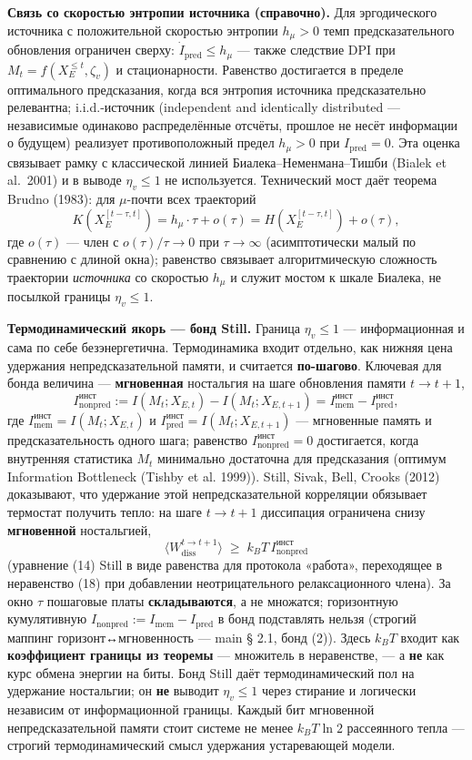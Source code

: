 \documentclass[pdflatex,sn-mathphys-ay]{sn-jnl}
\begin{document}
\textbf{Связь со скоростью энтропии источника (справочно).} Для эргодического источника с положительной скоростью энтропии \(h_\mu > 0\) темп предсказательного обновления ограничен сверху: \(\dot I_{\text{pred}} \le h_\mu\) --- также следствие DPI при \(M_t = f(X_E^{\le t}, \zeta_v)\) и стационарности. Равенство достигается в пределе оптимального предсказания, когда вся энтропия источника предсказательно релевантна; i.i.d.-источник (independent and identically distributed --- независимые одинаково распределённые отсчёты, прошлое не несёт информации о будущем) реализует противоположный предел \(h_\mu > 0\) при \(I_{\text{pred}} = 0\). Эта оценка связывает рамку с классической линией Биалека--Неменмана--Тишби (Bialek et al.~2001) и в выводе \(\eta_v \le 1\) не используется. Технический мост даёт теорема Brudno (1983): для \(\mu\)-почти всех траекторий \[K(X_E^{[t-\tau, t]}) = h_\mu \cdot \tau + o(\tau) = H(X_E^{[t-\tau, t]}) + o(\tau),\] где \(o(\tau)\) --- член с \(o(\tau)/\tau \to 0\) при \(\tau \to \infty\) (асимптотически малый по сравнению с длиной окна); равенство связывает алгоритмическую сложность траектории \emph{источника} со скоростью \(h_\mu\) и служит мостом к шкале Биалека, не посылкой границы \(\eta_v \le 1\).

\textbf{Термодинамический якорь --- бонд Still.} Граница \(\eta_v \le 1\) --- информационная и сама по себе безэнергетична. Термодинамика входит отдельно, как нижняя цена удержания непредсказательной памяти, и считается \textbf{по-шагово}. Ключевая для бонда величина --- \textbf{мгновенная} ностальгия на шаге обновления памяти \(t \to t+1\), \[I_{\text{nonpred}}^{\text{инст}} := I(M_t; X_{E,t}) - I(M_t; X_{E,t+1}) = I_{\text{mem}}^{\text{инст}} - I_{\text{pred}}^{\text{инст}},\] где \(I_{\text{mem}}^{\text{инст}} = I(M_t; X_{E,t})\) и \(I_{\text{pred}}^{\text{инст}} = I(M_t; X_{E,t+1})\) --- мгновенные память и предсказательность одного шага; равенство \(I_{\text{nonpred}}^{\text{инст}} = 0\) достигается, когда внутренняя статистика \(M_t\) минимально достаточна для предсказания (оптимум Information Bottleneck (Tishby et al. 1999)). Still, Sivak, Bell, Crooks (2012) доказывают, что удержание этой непредсказательной корреляции обязывает термостат получить тепло: на шаге \(t \to t+1\) диссипация ограничена снизу \textbf{мгновенной} ностальгией, \[\langle W_{\text{diss}}^{t\to t+1}\rangle \;\ge\; k_B T \, I_{\text{nonpred}}^{\text{инст}}\] (уравнение (14) Still в виде равенства для протокола «работа», переходящее в неравенство (18) при добавлении неотрицательного релаксационного члена). За окно \(\tau\) пошаговые платы \textbf{складываются}, а не множатся; горизонтную кумулятивную \(I_{\text{nonpred}} := I_{\text{mem}} - I_{\text{pred}}\) в бонд подставлять нельзя (строгий маппинг горизонт↔мгновенность --- main § 2.1, бонд (2)). Здесь \(k_B T\) входит как \textbf{коэффициент границы из теоремы} --- множитель в неравенстве, --- а \textbf{не} как курс обмена энергии на биты. Бонд Still даёт термодинамический пол на удержание ностальгии; он \textbf{не} выводит \(\eta_v \le 1\) через стирание и логически независим от информационной границы. Каждый бит мгновенной непредсказательной памяти стоит системе не менее \(k_B T \ln 2\) рассеянного тепла --- строгий термодинамический смысл удержания устаревающей модели.
\end{document}
